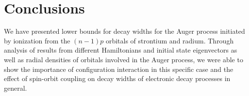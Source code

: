 \section{Conclusions}
\label{section:conclusions}

We have presented lower bounds for
decay widths for the Auger process initiated by
ionization from the $(n-1)p$ orbitals of strontium and radium.
Through analysis of results from different Hamiltonians and initial state
eigenvectors as well as radial densities of orbitals involved in the
Auger process, we were able to show the importance of configuration interaction
in this specific case and the effect of spin-orbit coupling on decay widths
of electronic decay processes in general.
